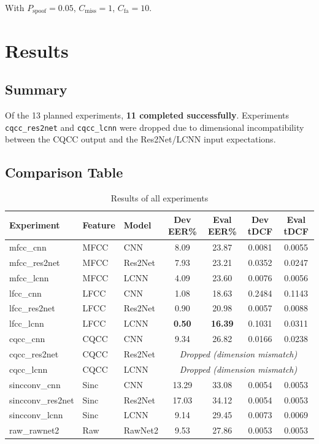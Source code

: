 \documentclass[12pt]{report}
\begin{document}
With $P_\text{spoof} = 0.05$, $C_\text{miss} = 1$, $C_\text{fa} = 10$.


\chapter{Results}

\section{Summary}

Of the 13 planned experiments, \textbf{11 completed successfully}. Experiments \texttt{cqcc\_res2net}
and \texttt{cqcc\_lcnn} were dropped due to dimensional incompatibility between the CQCC output
and the Res2Net/LCNN input expectations.

\section{Comparison Table}

\begin{table}[h!]
\centering
\caption{Results of all experiments}
\label{tab:results}
\begin{tabularx}{\textwidth}{lllcccc}
\toprule
\textbf{Experiment} & \textbf{Feature} & \textbf{Model}
    & \textbf{Dev EER\%} & \textbf{Eval EER\%}
    & \textbf{Dev tDCF} & \textbf{Eval tDCF} \\
\midrule
mfcc\_cnn          & MFCC & CNN      & 8.09  & 23.87 & 0.0081 & 0.0055 \\
mfcc\_res2net      & MFCC & Res2Net  & 7.93  & 23.21 & 0.0352 & 0.0247 \\
mfcc\_lcnn         & MFCC & LCNN     & 4.09  & 23.60 & 0.0076 & 0.0056 \\
lfcc\_cnn          & LFCC & CNN      & 1.08  & 18.63 & 0.2484 & 0.1143 \\
lfcc\_res2net      & LFCC & Res2Net  & 0.90  & 20.98 & 0.0057 & 0.0088 \\
lfcc\_lcnn         & LFCC & LCNN     & \textbf{0.50}  & \textbf{16.39} & 0.1031 & 0.0311 \\
cqcc\_cnn          & CQCC & CNN      & 9.34  & 26.82 & 0.0166 & 0.0238 \\
cqcc\_res2net      & CQCC & Res2Net  & \multicolumn{4}{c}{\textit{Dropped (dimension mismatch)}} \\
cqcc\_lcnn         & CQCC & LCNN     & \multicolumn{4}{c}{\textit{Dropped (dimension mismatch)}} \\
sincconv\_cnn      & Sinc & CNN      & 13.29 & 33.08 & 0.0054 & 0.0053 \\
sincconv\_res2net  & Sinc & Res2Net  & 17.03 & 34.12 & 0.0054 & 0.0053 \\
sincconv\_lcnn     & Sinc & LCNN     & 9.14  & 29.45 & 0.0073 & 0.0069 \\
raw\_rawnet2       & Raw  & RawNet2  & 9.53  & 27.86 & 0.0053 & 0.0053 \\
\bottomrule
\end{tabularx}
\end{table}
\end{document}
